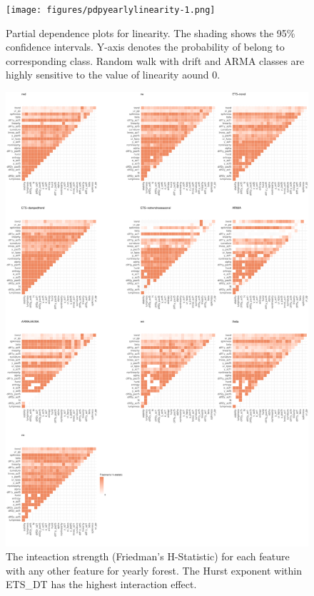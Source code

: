 \documentclass[11pt,a4paper,]{article}
\begin{document}
\begin{figure}
\centering
\texttt{[image: figures/pdpyearlylinearity-1.png]}
\caption{\label{fig:pdpyearlylinearity}Partial dependence plots for linearity. The shading shows the 95\% confidence intervals. Y-axis denotes the probability of belong to corresponding class. Random walk with drift and ARMA classes are highly sensitive to the value of linearity aound 0.}
\end{figure}

\begin{figure}
\centering
\includegraphics{figures/friedmany-1.pdf}
\caption{\label{fig:friedmany}The inteaction strength (Friedman's H-Statistic) for each feature with any other feature for yearly forest. The Hurst exponent within ETS\_DT has the highest interaction effect.}
\end{figure}
\end{document}

